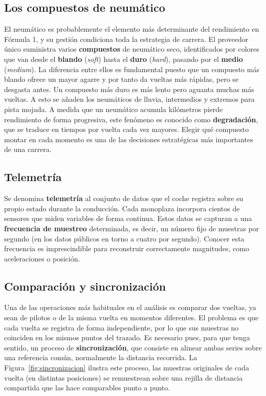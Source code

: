 \documentclass[12pt,a4paper,twoside,openright]{book}
\begin{document}
\subsection{Los compuestos de neumático}
El neumático es probablemente el elemento más determinante del rendimiento en Fórmula 1, y su gestión condiciona toda la estrategia de carrera. El proveedor único suministra varios \textbf{compuestos} de neumático seco, identificados por colores que van desde el \textbf{blando} (\textit{soft}) hasta el \textbf{duro} (\textit{hard}), pasando por el \textbf{medio} (\textit{medium}). La diferencia entre ellos es fundamental puesto que un compuesto más blando
ofrece un mayor agarre y por tanto da vueltas más rápidas, pero se desgasta antes. Un compuesto más duro es más lento pero aguanta muchas más vueltas. A esto se añaden los neumáticos de lluvia, intermedios y extremos para pista mojada. A medida que un neumático acumula kilómetros pierde rendimiento de forma progresiva, este fenómeno es conocido como
\textbf{degradación}, que se traduce en tiempos por vuelta cada vez mayores. Elegir qué compuesto montar en cada momento es una de las decisiones estratégicas más importantes de una carrera.
\subsection{Telemetría}
Se denomina \textbf{telemetría} al conjunto de datos que el coche registra sobre su propio estado durante la conducción. Cada monoplaza incorpora cientos de sensores que miden variables de forma continua. Estos datos se capturan a una \textbf{frecuencia de muestreo} determinada, es decir, un número fijo de muestras por segundo (en los datos públicos en torno a cuatro por segundo). Conocer esta frecuencia es imprescindible para reconstruir correctamente magnitudes, como aceleraciones o posición.

\subsection{Comparación y sincronización}
Una de las operaciones más habituales en el análisis es comparar dos vueltas, ya sean de pilotos o de la misma vuelta en momentos diferentes. El problema es que cada vuelta se registra de forma independiente, por lo que sus muestras no coinciden en los mismos puntos del trazado.
Es necesario pues, para que tenga sentido, un proceso de \textbf{sincronización}, que consiste en alinear ambas series sobre una referencia común, normalmente la distancia recorrida. La Figura~\ref{fig:sincronizacion} ilustra este proceso, las muestras originales de cada vuelta (en distintas posiciones) se remuestrean sobre una rejilla de distancia compartida que las hace comparables punto a punto.
\end{document}
